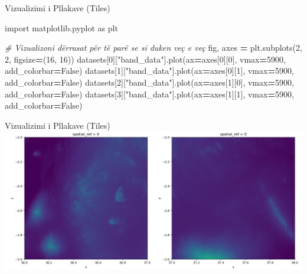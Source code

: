 \documentclass[
  ignorenonframetext,
]{beamer}
\newenvironment{Shaded}{\begin{snugshade}}{\end{snugshade}}
\newcommand{\CommentTok}[1]{\textcolor[rgb]{0.56,0.35,0.01}{\textit{#1}}}
\newcommand{\DecValTok}[1]{\textcolor[rgb]{0.00,0.00,0.81}{#1}}
\newcommand{\ImportTok}[1]{#1}
\newcommand{\NormalTok}[1]{#1}
\newcommand{\OperatorTok}[1]{\textcolor[rgb]{0.81,0.36,0.00}{\textbf{#1}}}
\newcommand{\StringTok}[1]{\textcolor[rgb]{0.31,0.60,0.02}{#1}}
\newcommand{\VariableTok}[1]{\textcolor[rgb]{0.00,0.00,0.00}{#1}}
\begin{document}
\begin{frame}[fragile]{Vizualizimi i Pllakave (Tiles)}
\protect\hypertarget{vizualizimi-i-pllakave-tiles-2}{}

\begin{Shaded}
\begin{Highlighting}[]
\ImportTok{import}\NormalTok{ matplotlib.pyplot }\ImportTok{as}\NormalTok{ plt}

\CommentTok{\# Vizualizoni dërrasat për të parë se si duken veç e veç}
\NormalTok{fig, axes }\OperatorTok{=}\NormalTok{ plt.subplots(}\DecValTok{2}\NormalTok{, }\DecValTok{2}\NormalTok{, figsize}\OperatorTok{=}\NormalTok{(}\DecValTok{16}\NormalTok{, }\DecValTok{16}\NormalTok{))}
\NormalTok{datasets[}\DecValTok{0}\NormalTok{][}\StringTok{"band\_data"}\NormalTok{].plot(ax}\OperatorTok{=}\NormalTok{axes[}\DecValTok{0}\NormalTok{][}\DecValTok{0}\NormalTok{], vmax}\OperatorTok{=}\DecValTok{5900}\NormalTok{, add\_colorbar}\OperatorTok{=}\VariableTok{False}\NormalTok{)}
\NormalTok{datasets[}\DecValTok{1}\NormalTok{][}\StringTok{"band\_data"}\NormalTok{].plot(ax}\OperatorTok{=}\NormalTok{axes[}\DecValTok{0}\NormalTok{][}\DecValTok{1}\NormalTok{], vmax}\OperatorTok{=}\DecValTok{5900}\NormalTok{, add\_colorbar}\OperatorTok{=}\VariableTok{False}\NormalTok{)}
\NormalTok{datasets[}\DecValTok{2}\NormalTok{][}\StringTok{"band\_data"}\NormalTok{].plot(ax}\OperatorTok{=}\NormalTok{axes[}\DecValTok{1}\NormalTok{][}\DecValTok{0}\NormalTok{], vmax}\OperatorTok{=}\DecValTok{5900}\NormalTok{, add\_colorbar}\OperatorTok{=}\VariableTok{False}\NormalTok{)}
\NormalTok{datasets[}\DecValTok{3}\NormalTok{][}\StringTok{"band\_data"}\NormalTok{].plot(ax}\OperatorTok{=}\NormalTok{axes[}\DecValTok{1}\NormalTok{][}\DecValTok{1}\NormalTok{], vmax}\OperatorTok{=}\DecValTok{5900}\NormalTok{, add\_colorbar}\OperatorTok{=}\VariableTok{False}\NormalTok{)}
\end{Highlighting}
\end{Shaded}
\end{frame}

\begin{frame}{Vizualizimi i Pllakave (Tiles)}
\protect\hypertarget{vizualizimi-i-pllakave-tiles-3}{}
\includegraphics{./Figs/tiles2.png}
\end{frame}
\end{document}
